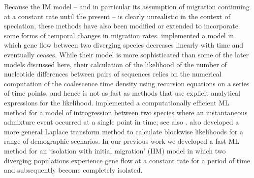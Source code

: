\documentclass[11pt]{article}
\begin{document}
Because the IM model -- and in particular its assumption of migration continuing at a constant rate until the present -- is clearly unrealistic in the context of speciation, these methods have also been modified or extended to incorporate some forms of 
temporal changes in migration rates. 
\citet{Innan2006} implemented a model in which gene flow between two diverging species decreases linearly with time and eventually ceases.
While their model is more sophisticated than some of the later models discussed here, their calculation of the likelihood of the number of nucleotide differences between pairs of sequences relies on the numerical computation of the coalescence time density using recursion equations on a series of time points,
and hence is not as fast as methods that use explicit analytical expressions for the likelihood.
\citet{Lohse2014} implemented a computationally efficient ML method for a model of introgression between two species where an instantaneous admixture event occurred at a single point in time; 
see also \citet{Hearn2014}.  
\citet{Lohse2011, Lohse2016} also developed a more general Laplace transform method to calculate blockwise likelihoods for a range of demographic scenarios.
In our previous work \citep{Herbots2012, Herbots2015, Costa2017} we developed a fast ML method for an `isolation with initial migration' (IIM) model in which two diverging populations experience gene flow at a constant rate for a period of time and subsequently become completely isolated.
\end{document}
